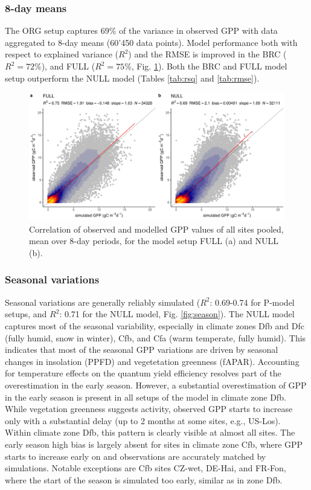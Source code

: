\documentclass{myreport}
\newcommand{\rsq}{$R^2$}
\begin{document}
\subsubsection{8-day means}

The ORG setup captures 69\% of the variance in observed GPP with data aggregated to 8-day means (60’450 data points). Model performance both with respect to explained variance ($R^2$) and the RMSE is improved in the BRC  ($R^2 = 72$\%), and FULL ($R^2 = 75$\%, Fig. \ref{fig:modobs_xdaily}). Both the BRC and FULL model setup outperform the NULL model (Tables \ref{tab:rsq} and \ref{tab:rmse}).

\begin{figure}[!ht]
    \includegraphics[width=\textwidth]{fig/modobs_xdaily.pdf}
    \caption{Correlation of observed and modelled GPP values of all sites pooled, mean over 8-day periods, for the model setup FULL (a) and NULL (b).}
    \label{fig:modobs_xdaily}
\end{figure}

\subsubsection{Seasonal variations}
\label{sec:results_seasonal}
Seasonal variations are generally reliably simulated (\rsq : 0.69-0.74 for P-model setups, and \rsq : 0.71 for the NULL model, Fig. \ref{fig:season}). The NULL model captures most of the seasonal variability, especially in climate zones Dfb and Dfc (fully humid, snow in winter), Cfb, and Cfa (warm temperate, fully humid). This indicates that most of the  seasonal GPP variations are driven by seasonal changes in insolation (PPFD) and vegetetation greenness (fAPAR). Accounting for temperature effects on the quantum yield efficiency resolves part of the overestimation in the early season. However, a substantial overestimation of GPP in the early season is present in all setups of the model in climate zone Dfb. While vegetation greenness suggests activity, observed GPP starts to increase only with a substantial delay (up to 2 months at some sites, e.g., US-Los). Within climate zone Dfb, this pattern is clearly visible at almost all sites. The early season high bias is largely absent for sites in climate zone Cfb, where GPP starts to increase early on and observations are accurately matched by simulations. Notable exceptions are Cfb sites CZ-wet, DE-Hai, and FR-Fon, where the start of the season is simulated too early, similar as in zone Dfb.
\end{document}
